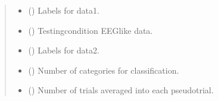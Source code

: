 \documentclass[letterpaper,10pt,english]{sphinxhowto}
\begin{document}
\begin{fulllineitems}
\begin{quote}
\begin{description}
\begin{itemize}
\item {} 
\sphinxAtStartPar
{} (\sphinxstyleliteralemphasis{\sphinxupquote{, }}\sphinxstyleliteralemphasis{\sphinxupquote{ {[}}}\sphinxstyleliteralemphasis{\sphinxupquote{, }}\sphinxstyleliteralemphasis{\sphinxupquote{{]}}}) \textendash{} Labels for data1.

\item {} 
\sphinxAtStartPar
{} (\sphinxstyleliteralemphasis{\sphinxupquote{, }}\sphinxstyleliteralemphasis{\sphinxupquote{ {[}}}\sphinxstyleliteralemphasis{\sphinxupquote{, }}\sphinxstyleliteralemphasis{\sphinxupquote{, }}\sphinxstyleliteralemphasis{\sphinxupquote{, }}\sphinxstyleliteralemphasis{\sphinxupquote{{]}}}) \textendash{} Testing\sphinxhyphen{}condition EEG\sphinxhyphen{}like data.

\item {} 
\sphinxAtStartPar
{} (\sphinxstyleliteralemphasis{\sphinxupquote{, }}\sphinxstyleliteralemphasis{\sphinxupquote{ {[}}}\sphinxstyleliteralemphasis{\sphinxupquote{, }}\sphinxstyleliteralemphasis{\sphinxupquote{{]}}}) \textendash{} Labels for data2.

\item {} 
\sphinxAtStartPar
{} (\sphinxstyleliteralemphasis{\sphinxupquote{, }}) \textendash{} Number of categories for classification.

\item {} 
\sphinxAtStartPar
{} (\sphinxstyleliteralemphasis{\sphinxupquote{, }}) \textendash{} Number of trials averaged into each pseudo\sphinxhyphen{}trial.


\end{itemize}
\end{description}
\end{quote}
\end{fulllineitems}
\end{document}
